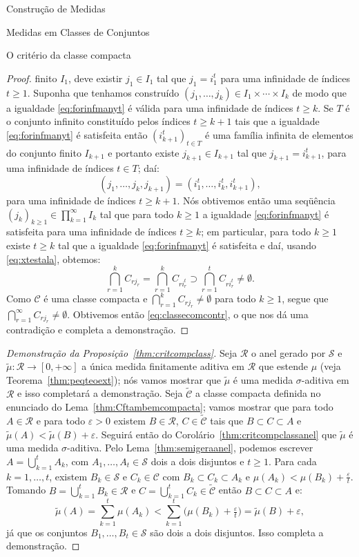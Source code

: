 \documentclass[oneside,final,11pt]{amsbook}
\theoremstyle{remark}\newtheorem{exercise}{Exercício}[chapter]
\theoremstyle{remark}\newtheorem{*exercise}[exercise]{\hbox to 0pt{\hskip 0pt minus 1fil*}Exercício}
\theoremstyle{definition}\newtheorem{exdefin}{Definição}[chapter]
\theoremstyle{plain}\newtheorem{teo}{Teorema}[section]
\theoremstyle{plain}\newtheorem{lem}[teo]{Lema}
\theoremstyle{plain}\newtheorem{prop}[teo]{Proposição}
\theoremstyle{plain}\newtheorem{cor}[teo]{Corolário}
\theoremstyle{definition}\newtheorem{defin}[teo]{Definição}
\theoremstyle{remark}\newtheorem{rem}[teo]{Observação}
\theoremstyle{definition}\newtheorem{notation}[teo]{Notação}
\theoremstyle{definition}\newtheorem{convention}[teo]{Convenção}
\theoremstyle{definition}\newtheorem{example}[teo]{Exemplo}
\numberwithin{section}{chapter}
\numberwithin{equation}{section}
\begin{document}
\begin{chapter}{Construção de Medidas}
\begin{section}{Medidas em Classes de Conjuntos}
\begin{subsection}{O critério da classe compacta}
\begin{proof}
finito $I_1$, deve existir $j_1\in I_1$ tal que $j_1=i^t_1$ para uma infinidade de índices
$t\ge1$. Suponha que tenhamos construído $(j_1,\ldots,j_k)\in I_1\times\cdots\times I_k$
de modo que a igualdade \eqref{eq:forinfmanyt} é válida para uma infinidade de índices $t\ge k$.
Se $T$ é o conjunto infinito constituído pelos índices $t\ge k+1$ tais que a igualdade \eqref{eq:forinfmanyt}
é satisfeita então $(i^t_{k+1})_{t\in T}$ é uma família infinita de elementos do conjunto
finito $I_{k+1}$ e portanto existe $j_{k+1}\in I_{k+1}$ tal que $j_{k+1}=i^t_{k+1}$,
para uma infinidade de índices $t\in T$; daí:
\[(j_1,\ldots,j_k,j_{k+1})=(i^t_1,\ldots,i^t_k,i^t_{k+1}),\]
para uma infinidade de índices $t\ge k+1$. Nós obtivemos então uma seqüência
$(j_k)_{k\ge1}\in\prod_{k=1}^\infty I_k$ tal que para todo $k\ge1$ a igualdade
\eqref{eq:forinfmanyt} é satisfeita para uma infinidade de índices $t\ge k$;
em particular, para todo $k\ge1$ existe $t\ge k$ tal que a igualdade \eqref{eq:forinfmanyt}
é satisfeita e daí, usando \eqref{eq:xtestala}, obtemos:
\[\bigcap_{r=1}^kC_{rj_r}=\bigcap_{r=1}^kC_{ri^t_r}\supset\bigcap_{r=1}^tC_{ri^t_r}\ne\emptyset.\]
Como $\mathcal C$ é uma classe compacta e $\bigcap_{r=1}^kC_{rj_r}\ne\emptyset$ para todo
$k\ge1$, segue que $\bigcap_{r=1}^\infty C_{rj_r}\ne\emptyset$. Obtivemos então \eqref{eq:classecomcontr},
o que nos dá uma contradição e completa a demonstração.
\end{proof}

\begin{proof}[Demonstração da Proposição~\ref{thm:critcompclass}]
Seja $\mathcal R$ o anel gerado por $\mathcal S$ e $\tilde\mu:\mathcal R\to[0,+\infty]$
a única medida finitamente aditiva em $\mathcal R$ que estende $\mu$ (veja Teorema~\ref{thm:peqteoext});
nós vamos mostrar que $\tilde\mu$ é uma medida $\sigma$-aditiva em $\mathcal R$ e isso completará
a demonstração. Seja $\widetilde{\mathcal C}$ a classe compacta definida no enunciado
do Lema~\ref{thm:Cftambemcompacta}; vamos mostrar que para todo $A\in\mathcal R$ e para
todo $\varepsilon>0$ existem $B\in\mathcal R$, $C\in\widetilde{\mathcal C}$ tais que
$B\subset C\subset A$ e $\tilde\mu(A)<\tilde\mu(B)+\varepsilon$. Seguirá então do
Corolário~\ref{thm:critcompclassanel} que $\tilde\mu$ é uma medida $\sigma$-aditiva.
Pelo Lema~\ref{thm:semigeraanel}, podemos escrever $A=\bigcup_{k=1}^tA_k$, com
$A_1,\ldots,A_t\in\mathcal S$ dois a dois disjuntos e $t\ge1$. Para cada $k=1,\ldots,t$,
existem $B_k\in\mathcal S$ e $C_k\in\mathcal C$ com $B_k\subset C_k\subset A_k$
e $\mu(A_k)<\mu(B_k)+\frac\varepsilon t$. Tomando $B=\bigcup_{k=1}^tB_k\in\mathcal R$
e $C=\bigcup_{k=1}^tC_k\in\widetilde{\mathcal C}$ então $B\subset C\subset A$ e:
\[\tilde\mu(A)=\sum_{k=1}^t\mu(A_k)<\sum_{k=1}^t\big(\mu(B_k)+\tfrac\varepsilon t\big)
=\tilde\mu(B)+\varepsilon,\]
já que os conjuntos $B_1,\ldots,B_t\in\mathcal S$ são dois a dois disjuntos. Isso completa
a demonstração.
\end{proof}


\end{subsection}
\end{section}
\end{chapter}
\end{document}
